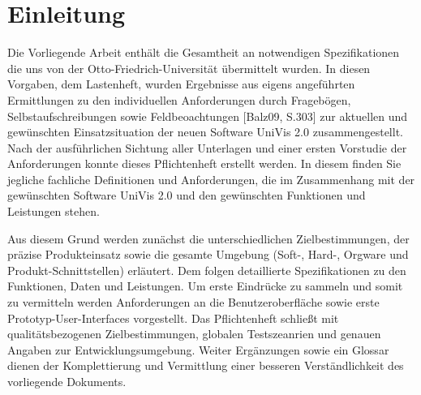 \section{Einleitung}
\label{sec:Einleitung}

Die Vorliegende Arbeit enthält die Gesamtheit an notwendigen Spezifikationen die uns von der Otto-Friedrich-Universität übermittelt wurden. 
In diesen Vorgaben, dem Lastenheft, wurden Ergebnisse aus eigens angeführten Ermittlungen zu den individuellen Anforderungen durch Fragebögen, Selbstaufschreibungen sowie Feldbeoachtungen [Balz09, S.303] zur aktuellen und gewünschten Einsatzsituation der neuen Software UniVis 2.0 zusammengestellt.
Nach der ausführlichen Sichtung aller Unterlagen und einer ersten Vorstudie der Anforderungen konnte dieses Pflichtenheft erstellt werden. In diesem finden Sie jegliche fachliche Definitionen und Anforderungen, die im Zusammenhang mit der gewünschten Software UniVis 2.0 und den gewünschten Funktionen und Leistungen stehen.

Aus diesem Grund werden zunächst die unterschiedlichen Zielbestimmungen, der präzise Produkteinsatz sowie die gesamte Umgebung (Soft-, Hard-, Orgware und Produkt-Schnittstellen) erläutert.
Dem folgen detaillierte Spezifikationen zu den Funktionen, Daten und Leistungen. Um erste Eindrücke zu sammeln und somit zu vermitteln werden Anforderungen an die Benutzeroberfläche sowie erste Prototyp-User-Interfaces vorgestellt. Das Pflichtenheft schließt mit qualitätsbezogenen Zielbestimmungen, globalen Testszeanrien und genauen Angaben zur Entwicklungsumgebung.
Weiter Ergänzungen sowie ein Glossar dienen der Komplettierung und Vermittlung einer besseren Verständlichkeit des vorliegende Dokuments.

